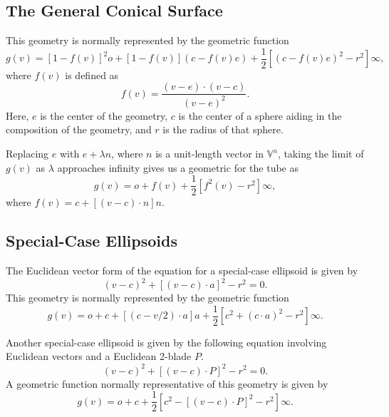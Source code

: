 \documentclass{article}
\newcommand{\V}{\mathbb{V}}
\newcommand{\nvao}{o}
\newcommand{\nvai}{\infty}
\begin{document}
\subsection{The General Conical Surface}

This geometry is normally represented by the geometric function
\begin{equation*}
g(v) = [1-f(v)]^2\nvao + [1-f(v)](c-f(v)e)+\frac{1}{2}[(c-f(v)e)^2-r^2]\nvai,
\end{equation*}
where $f(v)$ is defined as
\begin{equation*}
f(v) = \frac{(v-e)\cdot(v-c)}{(v-e)^2}.
\end{equation*}
Here, $e$ is the center of the geometry, $c$ is the center of a sphere aiding
in the composition of the geometry, and $r$ is the radius of that sphere.

Replacing $e$ with $e+\lambda n$, where $n$ is a unit-length vector in $\V^n$,
taking the limit of $g(v)$ as $\lambda$ approaches infinity gives us a geometric
for the tube as
\begin{equation*}
g(v) = \nvao + f(v) + \frac{1}{2}[f^2(v)-r^2]\nvai,
\end{equation*}
where $f(v)=c+[(v-c)\cdot n]n$.

\subsection{Special-Case Ellipsoids}

The Euclidean vector form of the equation for a special-case ellipsoid is given by
\begin{equation*}
(v-c)^2+[(v-c)\cdot a]^2-r^2=0.
\end{equation*}
This geometry is normally represented by the geometric function
\begin{equation*}
g(v) = \nvao + c + [(c-v/2)\cdot a]a + \frac{1}{2}[c^2+(c\cdot a)^2-r^2]\nvai.
\end{equation*}

Another special-case ellipsoid is given by the following equation involving
Euclidean vectors and a Euclidean 2-blade $P$.
\begin{equation*}
(v-c)^2+[(v-c)\cdot P]^2-r^2 = 0.
\end{equation*}
A geometric function normally representative of this geometry is given by
\begin{equation*}
g(v) = \nvao+c+\frac{1}{2}[c^2-[(v-c)\cdot P]^2-r^2]\nvai.
\end{equation*}
\end{document}
